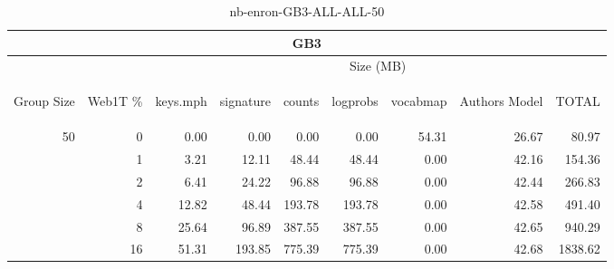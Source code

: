 \begin{center}
\begin{table}[htbp] 
 \begin{center}
\begin{tabular}{ | r | r | r | r | r | r | r | r | r |}
\hline
\multicolumn{9}{|c|}{GB3}\\
\hline
 & & \multicolumn{7}{|c|}{Size (MB)}\\ \cline{3-9}
\begin{sideways}Group Size\end{sideways} & \begin{sideways}Web1T \% \end{sideways} & \begin{sideways}keys.mph\end{sideways} & \begin{sideways}signature\end{sideways} & \begin{sideways}counts\end{sideways} & \begin{sideways}logprobs\end{sideways} & \begin{sideways}vocabmap\end{sideways} & \begin{sideways}Authors Model \end{sideways} & \begin{sideways}TOTAL\end{sideways}\\
\hline
\multirow{5}{*}{50}
 & 0 & 0.00 & 0.00 & 0.00 & 0.00 & 54.31 & 26.67 & 80.97\\ \cline{2-9}
 & 1 & 3.21 & 12.11 & 48.44 & 48.44 & 0.00 & 42.16 & 154.36\\ \cline{2-9}
 & 2 & 6.41 & 24.22 & 96.88 & 96.88 & 0.00 & 42.44 & 266.83\\ \cline{2-9}
 & 4 & 12.82 & 48.44 & 193.78 & 193.78 & 0.00 & 42.58 & 491.40\\ \cline{2-9}
 & 8 & 25.64 & 96.89 & 387.55 & 387.55 & 0.00 & 42.65 & 940.29\\ \cline{2-9}
 & 16 & 51.31 & 193.85 & 775.39 & 775.39 & 0.00 & 42.68 & 1838.62\\ \cline{2-9}
\hline
\end{tabular}
\caption{nb-enron-GB3-ALL-ALL-50}
\label{table:nb-enron-GB3-ALL-ALL-50}
\end{center}
 \end{table}
\end{center}

